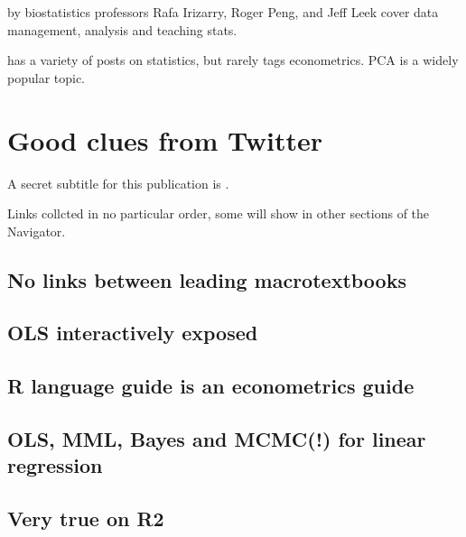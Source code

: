 \documentclass[letterpaper,10pt,english]{sphinxmanual}
\begin{document}
 by biostatistics
professors Rafa Irizarry, Roger Peng, and Jeff Leek cover data management,
analysis and teaching stats.

 has a variety of posts on statistics, but rarely tags econometrics. PCA is a widely popular topic.


\chapter{Good clues from Twitter}
\label{\detokenize{tweets:good-clues-from-twitter}}\label{\detokenize{tweets::doc}}
A secret subtitle for this publication is .

Links collcted in no particular order, some will show in other sections of the Navigator.


\section{No links between leading macrotextbooks}
\label{\detokenize{tweets:no-links-between-leading-macrotextbooks}}



\section{OLS interactively exposed}
\label{\detokenize{tweets:ols-interactively-exposed}}



\section{R language guide is an econometrics guide}
\label{\detokenize{tweets:r-language-guide-is-an-econometrics-guide}}



\section{OLS, MML, Bayes and MCMC(!) for linear regression}
\label{\detokenize{tweets:ols-mml-bayes-and-mcmc-for-linear-regression}}


\section{Very true on R2}
\label{\detokenize{tweets:very-true-on-r2}}
\end{document}

